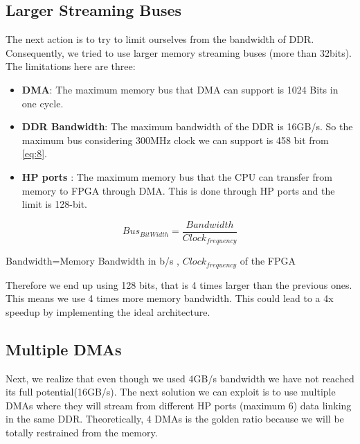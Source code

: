 \subsection{Larger Streaming Buses}
The next action is to try to limit ourselves from the bandwidth of DDR. Consequently, we tried to use larger memory streaming buses (more than 32bits). The limitations here are three:

\begin{itemize}

    \item \textbf{DMA}: The maximum memory bus that DMA can support is 1024 Bits in one cycle.
     
     \item \textbf{DDR Bandwidth}: The maximum bandwidth of the DDR is 16GB/s. So the maximum bus considering 300MHz clock we can support is 458 bit from \ref{eq:8}.
    \item \textbf{HP ports }: The maximum memory bus that the CPU can transfer from memory to FPGA through DMA. This is done through HP ports and the limit is 128-bit. \newline \newline
    
\end{itemize}

\begin{equation}\label{eq:8}
  Bus_{BitWidth}= \frac{Bandwidth}{Clock_{frequency}}
  \end{equation}
  \begin{center}
       \small{Bandwidth=Memory Bandwidth in b/s , $Clock_{frequency}$ of the FPGA} \newline 
  \end{center}

Therefore we end up using 128 bits, that is 4 times larger than the previous ones. This means we use 4 times more memory bandwidth. This could lead to a 4x speedup by implementing the ideal architecture. 

\subsection{Multiple DMAs}
Next, we realize that even though we used 4GB/s bandwidth we have not reached its full potential(16GB/s). The next solution we can exploit is to use multiple DMAs where they will stream from different HP ports (maximum 6) data linking in the same DDR. Theoretically, 4 DMAs is the golden ratio because we will be totally restrained from the memory. 

